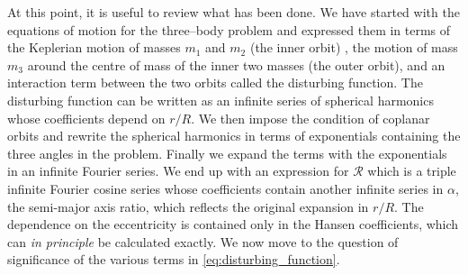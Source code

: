 \documentclass[ twoside,openright,titlepage,numbers=noenddot,headinclude,%
                footinclude=true,cleardoublepage=empty,abstractoff, %
                BCOR=5mm,paper=a4,fontsize=11pt,%
                american,%
                ]{scrreprt}
\begin{document}
At this point, it is useful to review what has been done. We have started
with the equations of motion for the three--body problem and expressed them
in terms of the Keplerian motion of masses $m_1$ and $m_2$ (the inner orbit) 
, the motion of mass $m_3$ around the centre of mass of the inner 
two masses (the outer orbit), and an interaction term between the two
orbits called the disturbing function. The disturbing function
can be written as an infinite series of spherical harmonics 
whose coefficients depend on $r/R$. We then impose the 
condition of coplanar orbits and rewrite the spherical harmonics in 
terms of exponentials containing the three angles in the problem. Finally
we expand the terms with the exponentials in an infinite Fourier series.
We end up with an expression for $\mathcal{R}$ which is a triple infinite
Fourier cosine series whose coefficients contain another infinite 
series in $\alpha$, the semi-major axis ratio, which reflects the original
expansion in $r/R$. The dependence on the eccentricity is contained
only in the Hansen coefficients, which can \emph{in principle} be
calculated exactly. We now move to the question of significance
of the various terms in \cref{eq:disturbing_function}.
\end{document}
